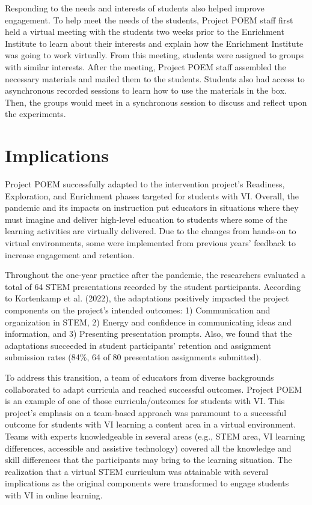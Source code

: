 \documentclass[11pt]{sig-alternate}
\begin{document}
\begin{large}
{Responding to the needs and interests of students also helped improve engagement. To help meet the needs of the students, Project POEM staff first held a virtual meeting with the students two weeks prior to the Enrichment Institute to learn about their interests and explain how the Enrichment Institute was going to work virtually. From this meeting, students were assigned to groups with similar interests. After the meeting, Project POEM staff assembled the necessary materials and mailed them to the students. Students also had access to asynchronous recorded sessions to learn how to use the materials in the box. Then, the groups would meet in a synchronous session to discuss and reflect upon the experiments.

\section*{Implications}

Project POEM successfully adapted to the intervention project's Readiness, Exploration, and Enrichment phases targeted for students with VI. Overall, the pandemic and its impacts on instruction put educators in situations where they must imagine and deliver high-level education to students where some of the learning activities are virtually delivered. Due to the changes from hands-on to virtual environments, some were implemented from previous years' feedback to increase engagement and retention. 

Throughout the one-year practice after the pandemic, the researchers evaluated a total of 64 STEM presentations recorded by the student participants. According to Kortenkamp et al. (2022), the adaptations positively impacted the project components on the project’s intended outcomes: 1) Communication and organization in STEM, 2) Energy and confidence in communicating ideas and information, and 3) Presenting presentation prompts. Also, we found that the adaptations succeeded in student participants’ retention and assignment submission rates (84\%, 64 of 80 presentation assignments submitted).

To address this transition, a team of educators from diverse backgrounds collaborated to adapt curricula and reached successful outcomes. Project POEM is an example of one of those curricula/outcomes for students with VI. This project’s emphasis on a team-based approach was paramount to a successful outcome for students with VI learning a content area in a virtual environment. Teams with experts knowledgeable in several areas (e.g., STEM area, VI learning differences, accessible and assistive technology) covered all the knowledge and skill differences that the participants may bring to the learning situation. The realization that a virtual STEM curriculum was attainable with several implications as the original components were transformed to engage students with VI in online learning.

}
\end{large}
\end{document}
